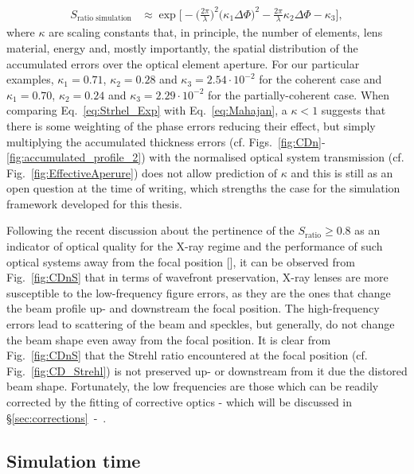 \begin{refsection}
\begin{align}\label{eq:Strhel_Exp}
    S_{\text{ratio simulation}}&\approx\exp{\bigg[- \bigg(\frac{2\pi}{\lambda}\bigg)^2\big(\kappa_1\Delta\Phi\big)^2-\frac{2\pi}{\lambda}\kappa_2\Delta\Phi-\kappa_3\bigg]},
\end{align}
where $\kappa$ are scaling constants that, in principle, the number of elements, lens material, energy and, mostly importantly, the spatial distribution of the accumulated errors over the optical element aperture. For our particular examples, $\kappa_1=0.71$, $\kappa_2=0.28$ and $\kappa_3=2.54\cdot10^{-2}$ for the coherent case and $\kappa_1=0.70$, $\kappa_2=0.24$ and $\kappa_3=2.29\cdot10^{-2}$ for the partially-coherent case. When comparing Eq.~\ref{eq:Strhel_Exp} with Eq.~\ref{eq:Mahajan}, a $\kappa<1$ suggests that there is some weighting of the phase errors reducing their effect, but simply multiplying the accumulated thickness errors (cf. Figs.~\ref{fig:CDn}-\ref{fig:accumulated_profile_2}) with the normalised optical system transmission (cf. Fig.~\ref{fig:EffectiveAperure}) does not allow prediction of $\kappa$ and this is still as an open question at the time of writing, which strengths the case for the simulation framework developed for this thesis.

Following the recent discussion about the pertinence of the $S_\text{ratio}\geq0.8$ as an indicator of optical quality for the X-ray regime and the performance of such optical systems away from the focal position [\cite{Cocco2015, Cocco2019}], it can be observed from Fig.~\ref{fig:CDnS} that in terms of wavefront preservation, X-ray lenses are more susceptible to the low-frequency figure errors, as they are the ones that change the beam profile up- and downstream the focal position. The high-frequency errors lead to scattering of the beam and speckles, but generally, do not change the beam shape even away from the focal position. It is clear from Fig.~\ref{fig:CDnS} that the Strehl ratio encountered at the focal position (cf. Fig.~\ref{fig:CD_Strehl}) is not preserved up- or downstream from it due the distored beam shape. Fortunately, the low frequencies are those which can be readily corrected by the fitting of corrective optics - which will be discussed in \S\ref{sec:corrections}~-~\textit{}. 

\subsection{Simulation time}\label{section:discussion_time}


\end{refsection}
